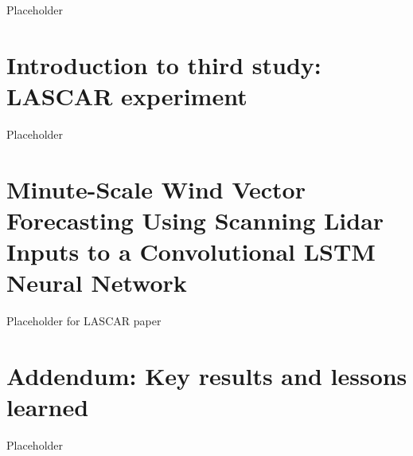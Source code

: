 Placeholder


\clearpage
\section{Introduction to third study: LASCAR experiment}
\label{sec:lascar_intro}

Placeholder


\clearpage
\section{Minute-Scale Wind Vector Forecasting Using Scanning Lidar Inputs to a Convolutional LSTM Neural Network}
\label{sec:lascar_paper}

Placeholder for LASCAR paper
%

\clearpage
\section{Addendum: Key results and lessons learned}
\label{sec:lascar_addendum}

Placeholder